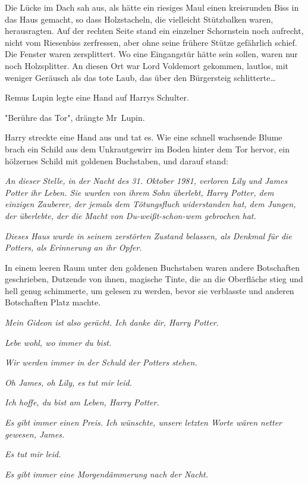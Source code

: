 {Die Lücke im Dach sah aus, als hätte ein riesiges Maul einen kreisrunden Biss in das Haus gemacht, so dass Holzstacheln, die vielleicht Stützbalken waren, herausragten. Auf der rechten Seite stand ein einzelner Schornstein noch aufrecht, nicht vom Riesenbiss zerfressen, aber ohne seine frühere Stütze gefährlich schief. Die Fenster waren zersplittert. Wo eine Eingangstür hätte sein sollen, waren nur noch Holzsplitter. An diesen Ort war Lord Voldemort gekommen, lautlos, mit weniger Geräusch als das tote Laub, das über den Bürgersteig schlitterte…

Remus Lupin legte eine Hand auf Harrys Schulter.

"Berühre das Tor", drängte Mr~Lupin.

Harry streckte eine Hand aus und tat es. Wie eine schnell wachsende Blume brach ein Schild aus dem Unkrautgewirr im Boden hinter dem Tor hervor, ein hölzernes Schild mit goldenen Buchstaben, und darauf stand:

\emph{An dieser Stelle, in der Nacht des 31. Oktober 1981, verloren Lily und James Potter ihr Leben. Sie wurden von ihrem Sohn überlebt, Harry Potter, dem einzigen Zauberer, der jemals dem Tötungsfluch widerstanden hat, dem Jungen, der überlebte, der die Macht von Du-weißt-schon-wem gebrochen hat.}

\emph{Dieses Haus wurde in seinem zerstörten Zustand belassen, als Denkmal für die Potters, als Erinnerung an ihr Opfer.}

In einem leeren Raum unter den goldenen Buchstaben waren andere Botschaften geschrieben, Dutzende von ihnen, magische Tinte, die an die Oberfläche stieg und hell genug schimmerte, um gelesen zu werden, bevor sie verblasste und anderen Botschaften Platz machte.

\emph{Mein Gideon ist also gerächt. Ich danke dir, Harry Potter.}

\emph{Lebe wohl, wo immer du bist.}

\emph{Wir werden immer in der Schuld der Potters stehen.}

\emph{Oh James, oh Lily, es tut mir leid.}

\emph{Ich hoffe, du bist am Leben, Harry Potter.}

\strut 

\emph{Es gibt immer einen Preis. Ich wünschte, unsere letzten Worte wären netter gewesen, James.}

\emph{Es tut mir leid.}

\emph{Es gibt immer eine Morgendämmerung nach der Nacht.}

}
